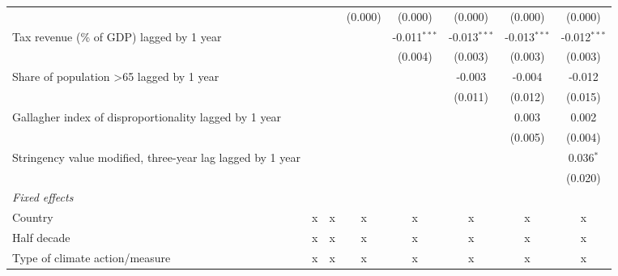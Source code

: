\begin{tabular}{lccccccc}
                                                                    &             &             & (0.000)      & (0.000)        & (0.000)        & (0.000)        & (0.000)\\   
   Tax revenue (\% of GDP) lagged by 1 year                         &             &             &              & -0.011$^{***}$ & -0.013$^{***}$ & -0.013$^{***}$ & -0.012$^{***}$\\   
                                                                    &             &             &              & (0.004)        & (0.003)        & (0.003)        & (0.003)\\   
   Share of population >65 lagged by 1 year                         &             &             &              &                & -0.003         & -0.004         & -0.012\\   
                                                                    &             &             &              &                & (0.011)        & (0.012)        & (0.015)\\   
   Gallagher index of disproportionality lagged by 1 year           &             &             &              &                &                & 0.003          & 0.002\\   
                                                                    &             &             &              &                &                & (0.005)        & (0.004)\\   
   Stringency value modified, three-year lag lagged by 1 year       &             &             &              &                &                &                & 0.036$^{*}$\\   
                                                                    &             &             &              &                &                &                & (0.020)\\   
   \emph{Fixed effects}\\
   Country                                                          & x           & x           & x            & x              & x              & x              & x\\  
   Half decade                                                      & x           & x           & x            & x              & x              & x              & x\\  
   Type of climate action/measure                                   & x           & x           & x            & x              & x              & x              & x\\  

\end{tabular}
